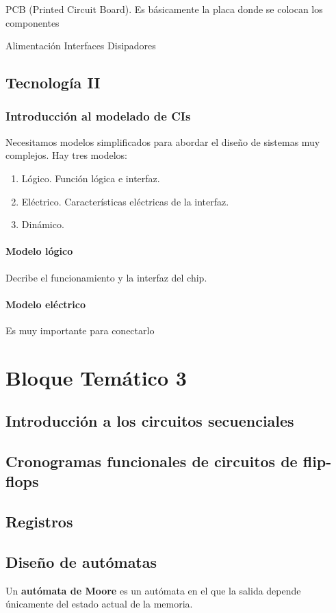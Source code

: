 \documentclass[a4paper]{book}
\begin{document}
PCB (Printed Circuit Board). Es básicamente la placa donde se colocan los componentes 

Alimentación
Interfaces
Disipadores

\section{Tecnología II}
\subsection{Introducción al modelado de CIs}
Necesitamos modelos simplificados para abordar el diseño de sistemas muy complejos.
Hay tres modelos:
\begin{enumerate}
\item Lógico. Función lógica e interfaz.
\item Eléctrico. Características eléctricas de la interfaz.
\item Dinámico.
\end{enumerate}
\subsubsection{Modelo lógico}
Decribe el funcionamiento y la interfaz del chip.
\subsubsection{Modelo eléctrico}
Es muy importante para conectarlo  

\chapter{Bloque Temático 3}


\section{Introducción a los circuitos secuenciales}
\section{Cronogramas funcionales de circuitos de flip-flops}
\section{Registros}
\section{Diseño de autómatas}
Un \textbf{autómata de Moore} es un autómata en el que la salida depende únicamente del estado actual de la memoria.
\end{document}
